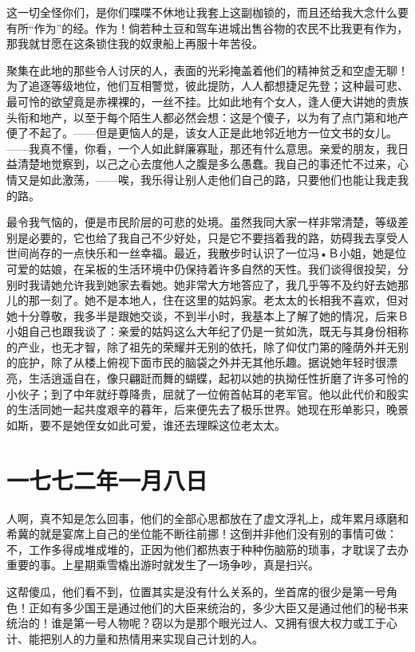 \documentclass[12pt,oneside]{book}
\begin{document}
这一切全怪你们，是你们喋喋不休地让我套上这副枷锁的，而且还给我大念什么要有所“作为”的经。作为！倘若种土豆和驾车进城出售谷物的农民不比我更有作为，那我就甘愿在这条锁住我的奴隶船上再服十年苦役。

聚集在此地的那些令人讨厌的人，表面的光彩掩盖着他们的精神贫乏和空虚无聊！为了追逐等级地位，他们互相警觉，彼此提防，人人都想捷足先登；这种最可悲、最可怜的欲望竟是赤裸裸的，一丝不挂。比如此地有个女人，逢人便大讲她的贵族头衔和地产，以至于每个陌生人都必然会想：这是个傻子，以为有了点门第和地产便了不起了。——但是更恼人的是，该女人正是此地邻近地方一位文书的女儿。——我真不懂，你看，一个人如此鲜廉寡耻，那还有什么意思。亲爱的朋友，我日益清楚地觉察到，以己之心去度他人之腹是多么愚蠢。我自己的事还忙不过来，心情又是如此激荡，——唉，我乐得让别人走他们自己的路，只要他们也能让我走我的路。

最令我气恼的，便是市民阶层的可悲的处境。虽然我同大家一样非常清楚，等级差别是必要的，它也给了我自己不少好处，只是它不要挡着我的路，妨碍我去享受人世间尚存的一点快乐和一丝幸福。最近，我散步时认识了一位冯•Ｂ小姐，她是位可爱的姑娘，在呆板的生活环境中仍保持着许多自然的天性。我们谈得很投契，分别时我请她允许我到她家去看她。她非常大方地答应了，我几乎等不及约好去她那儿的那一刻了。她不是本地人，住在这里的姑妈家。老太太的长相我不喜欢，但对她十分尊敬，我多半是跟她交谈，不到半小时，我基本上了解了她的情况，后来Ｂ小姐自己也跟我谈了：亲爱的姑妈这么大年纪了仍是一贫如洗，既无与其身份相称的产业，也无才智，除了祖先的荣耀并无别的依托，除了仰仗门第的隆荫外并无别的庇护，除了从楼上俯视下面市民的脑袋之外并无其他乐趣。据说她年轻时很漂亮，生活逍遥自在，像只翩跹而舞的蝴蝶，起初以她的执拗任性折磨了许多可怜的小伙子；到了中年就纡尊降贵，屈就了一位俯首帖耳的老军官。他以此代价和殷实的生活同她一起共度艰辛的暮年，后来便先去了极乐世界。她现在形单影只，晚景如斯，要不是她侄女如此可爱，谁还去理睬这位老太太。
　　

\chapter{一七七二年一月八日}
人啊，真不知是怎么回事，他们的全部心思都放在了虚文浮礼上，成年累月琢磨和希冀的就是宴席上自己的坐位能不断往前挪！这倒并非他们没有别的事情可做：不，工作多得成堆成堆的，正因为他们都热衷于种种伤脑筋的琐事，才耽误了去办重要的事。上星期乘雪橇出游时就发生了一场争吵，真是扫兴。

这帮傻瓜，他们看不到，位置其实是没有什么关系的，坐首席的很少是第一号角色！正如有多少国王是通过他们的大臣来统治的，多少大臣又是通过他们的秘书来统治的！谁是第一号人物呢？窃以为是那个眼光过人、又拥有很大权力或工于心计、能把别人的力量和热情用来实现自己计划的人。
　　
\end{document}
